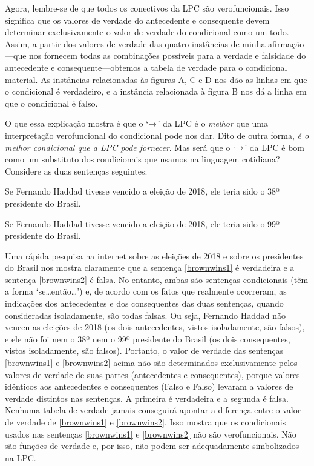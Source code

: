 Agora, lembre-se de que todos os conectivos da LPC são verofuncionais. Isso significa que os valores de verdade do antecedente e consequente devem determinar exclusivamente o valor de verdade do condicional como um todo.
Assim, a partir dos valores de verdade das quatro instâncias de minha afirmação---que nos fornecem todas as combinações possíveis para a verdade e falsidade do antecedente e consequente---obtemos a tabela de verdade para o condicional material.
As instâncias relacionadas às figuras A, C e D nos dão as linhas em que o condicional é verdadeiro, e a instância relacionada à figura B nos dá a linha em que o condicional é falso.

O que essa explicação mostra é que o `$\rightarrow$' da LPC é o \emph{melhor} que uma interpretação verofuncional do condicional pode nos dar.
Dito de outra forma, \emph{é o melhor condicional que a LPC pode fornecer}.
Mas será que o `$\rightarrow$' da LPC é bom como um substituto dos condicionais que usamos na linguagem cotidiana?
Considere as duas sentenças seguintes:
	\begin{earg}
		\item[\ex{brownwins1}] Se Fernando Haddad tivesse vencido a eleição de 2018, ele teria sido o 38º  presidente do Brasil.
		\item[\ex{brownwins2}] Se Fernando Haddad tivesse vencido a eleição de 2018, ele teria sido o 99º presidente do Brasil.
	\end{earg}
Uma rápida pesquisa na internet sobre as eleições de 2018 e sobre os presidentes do Brasil nos mostra claramente que a sentença \ref{brownwins1} é verdadeira e a sentença \ref{brownwins2} é falsa.
No entanto, ambas são sentenças condicionais (têm a forma `se\ldots então\ldots') e, de acordo com os fatos que realmente ocorreram, as indicações dos antecedentes e dos consequentes das duas sentenças, quando consideradas isoladamente, são todas falsas.
Ou seja, Fernando Haddad não venceu as eleições de 2018 (os dois antecedentes, vistos isoladamente, são falsos), e ele não foi nem o 38º nem o 99º presidente do Brasil (os dois consequentes, vistos isoladamente, são falsos).
Portanto, o valor de verdade das sentenças \ref{brownwins1} e \ref{brownwins2} acima não são determinados  exclusivamente pelos valores de verdade de suas partes (antecedentes e consequentes),
porque valores idênticos aos antecedentes e consequentes (Falso e Falso) levaram a valores de verdade distintos nas sentenças.
A primeira é verdadeira e a segunda é falsa.
Nenhuma tabela de verdade jamais conseguirá apontar a diferença entre o valor de verdade de \ref{brownwins1} e \ref{brownwins2}.
Isso mostra que os condicionais usados nas sentenças \ref{brownwins1} e \ref{brownwins2} não são verofuncionais.
Não são funções de verdade e, por isso, não podem ser adequadamente simbolizados na LPC.

